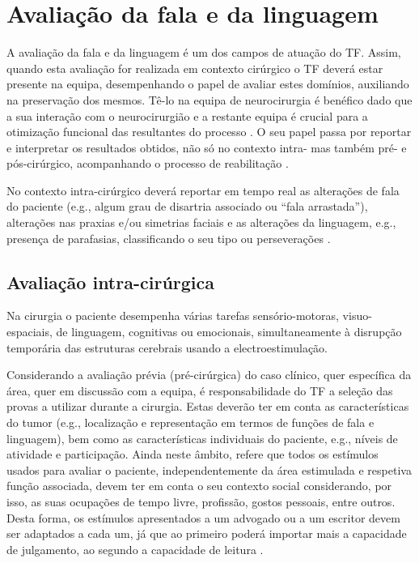 \documentclass[output=paper,colorlinks,citecolor=brown,booklanguage=portuguese]{langscibook}
\begin{document}
\section{Avaliação da fala e da linguagem}

A avaliação da fala e da linguagem é um dos campos de atuação do TF. Assim, quando esta avaliação for realizada em contexto cirúrgico o TF deverá estar presente na equipa, desempenhando o papel de avaliar estes domínios, auxiliando na preservação dos mesmos. Tê-lo na equipa de neurocirurgia é benéfico dado que a sua interação com o neurocirurgião e a restante equipa é crucial para a otimização funcional das resultantes do processo \citep{Rofes2017}. O seu papel passa por reportar e interpretar os resultados obtidos, não só no contexto intra- mas também pré- e pós-cirúrgico, acompanhando o processo de reabilitação \citep{Geemen2014}. 

No contexto intra-cirúrgico deverá reportar em tempo real as alterações de fala do paciente (e.g., algum grau de disartria associado ou “fala arrastada”), alterações nas praxias e/ou simetrias faciais e as alterações da linguagem, e.g., presença de parafasias, classificando o seu tipo ou perseverações \citep{Geemen2014, Maldonado2011}.

\subsection{Avaliação intra-cirúrgica}

Na cirurgia o paciente desempenha várias tarefas sensório-motoras, visuo-espaci\-ais, de linguagem, cognitivas ou emocionais, simultaneamente à disrupção temporária das estruturas cerebrais usando a electroestimulação. 

Considerando a avaliação prévia (pré-cirúrgica) do caso clínico, quer específica da área, quer em discussão com a equipa, é responsabilidade do TF a seleção das provas a utilizar durante a cirurgia. Estas deverão ter em conta as características do tumor (e.g., localização e representação em termos de funções de fala e linguagem), bem como as características individuais do paciente, e.g., níveis de atividade e participação. Ainda neste âmbito, \citet{Duffau2012} refere que todos os estímulos usados para avaliar o paciente, independentemente da área estimulada e respetiva função associada, devem ter em conta o seu contexto social considerando, por isso, as suas ocupações de tempo livre, profissão, gostos pessoais, entre outros. Desta forma, os estímulos apresentados a um advogado ou a um escritor devem ser adaptados a cada um, já que ao primeiro poderá importar mais a capacidade de julgamento, ao segundo a capacidade de leitura \citep{Duffau2012}.
\end{document}

